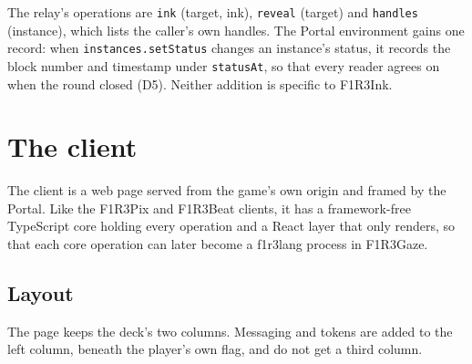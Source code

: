 \documentclass[11pt,a4paper]{article}
\newcommand{\code}[1]{\texttt{#1}}
\begin{document}
The relay's operations are \code{ink} (target, ink), \code{reveal} (target) and \code{handles}
(instance), which lists the caller's own handles. The Portal environment gains one record: when
\code{instances.setStatus} changes an instance's status, it records the block number and
timestamp under \code{statusAt}, so that every reader agrees on when the round closed (D5).
Neither addition is specific to F1R3Ink.

\section{The client}\label{sec:client}

The client is a web page served from the game's own origin and framed by the Portal. Like the
F1R3Pix and F1R3Beat clients, it has a framework-free TypeScript core holding every operation
and a React layer that only renders, so that each core operation can later become a f1r3lang
process in F1R3Gaze.

\subsection{Layout}

The page keeps the deck's two columns. Messaging and tokens are added to the left column,
beneath the player's own flag, and do not get a third column.
\end{document}
